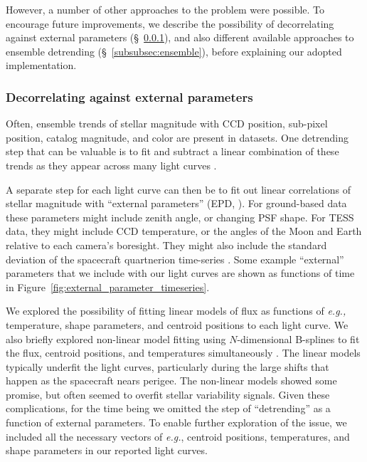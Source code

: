 \documentclass[12pt,twocolumn,tighten]{aastex62}
\begin{document}
However, a number of other approaches to the problem were possible. To
encourage future improvements, we describe the possibility of
decorrelating against external parameters
(\S~\ref{subsubsec:external}), and also different available approaches
to ensemble detrending (\S~\ref{subsubsec:ensemble}), before
explaining our adopted implementation.


\subsubsection{Decorrelating against external parameters}
\label{subsubsec:external}

Often, ensemble trends of stellar magnitude with CCD position,
sub-pixel position, catalog magnitude, and color are present in
datasets.  One detrending step that can be valuable is to fit and
subtract a linear combination of these trends as they appear across
many light curves \citep[{\it e.g.},][\S~5.5]{zhang_precision_2016}.

A separate step for each light curve can then be to fit out linear
correlations of stellar magnitude with ``external parameters'' (EPD,
\citealt[][]{bakos_2010,huang_high-precision_2015}).  For ground-based
data these parameters might include zenith angle, or changing PSF
shape.  For TESS data, they might include CCD temperature, or the
angles of the Moon and Earth relative to each camera's boresight.
They might also include the standard deviation of the spacecraft
quartnerion time-series \citep{vanderburg_hr858_2019}.  Some example
``external'' parameters that we include with our light curves are
shown as functions of time in
Figure~\ref{fig:external_parameter_timeseries}.

We explored the possibility of fitting linear models of flux as
functions of {\it e.g.,} temperature, shape parameters, and centroid
positions to each light curve.  We also briefly explored non-linear
model fitting using $N$-dimensional B-splines to fit the flux,
centroid positions, and temperatures simultaneously
\citep{dierckx_curve_1996}.  The linear models typically underfit the
light curves, particularly during the large shifts that happen as the
spacecraft nears perigee.  The non-linear models showed some promise,
but often seemed to overfit stellar variability signals.  Given these
complications, for the time being we omitted the step of
``detrending'' as a function of external parameters. To enable further
exploration of the issue, we included all the necessary vectors of
{\it e.g.}, centroid positions, temperatures, and shape parameters in
our reported light curves.
\end{document}
